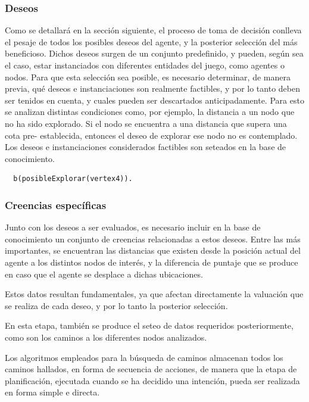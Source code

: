 \subsubsection{Deseos}
\label{sec:deseos}

Como se detallará en la sección siguiente, el proceso de toma de
decisión conlleva el pesaje de todos los posibles deseos del agente, y
la posterior selección del más beneficioso.
Dichos deseos surgen de un conjunto predefinido, y pueden, según sea
el caso, estar instanciados con diferentes entidades del juego, como
agentes o nodos. Para que esta selección sea posible, es necesario
determinar, de manera previa, qué deseos e instanciaciones son
realmente factibles, y por lo tanto deben ser tenidos en cuenta, y
cuales pueden ser descartados anticipadamente.
Para esto se analizan distintas condiciones como, por ejemplo, la
distancia a un nodo que no ha sido explorado.
Si el nodo se encuentra a una distancia que supera una cota pre-
establecida, entonces el deseo de explorar ese nodo no es contemplado.
Los deseos e instanciaciones considerados factibles son seteados en la
base de conocimiento.

\begin{verbatim}
  b(posibleExplorar(vertex4)).
\end{verbatim}

\subsubsection{Creencias específicas} 
\label{sec:creencias_especificas}



Junto con los deseos a ser evaluados, es necesario incluir en la base
de conocimiento un conjunto de creencias relacionadas a estos deseos.
Entre las más importantes, se encuentran las distancias que existen
desde la posición actual del agente a los distintos nodos de interés,
y la diferencia de puntaje que se produce en caso que el agente se
desplace a dichas ubicaciones. 

Estos datos resultan fundamentales, ya
que afectan directamente la valuación que se realiza de cada deseo, y
por lo tanto la posterior selección.



En esta etapa, también se produce el seteo de datos requeridos
posteriormente, como son los caminos a los diferentes nodos
analizados. 

Los algoritmos empleados para la búsqueda de caminos
almacenan todos los caminos hallados, en forma de secuencia de
acciones, de manera que la etapa de planificación, ejecutada cuando
se ha decidido una intención, pueda ser realizada en forma simple e
directa.



